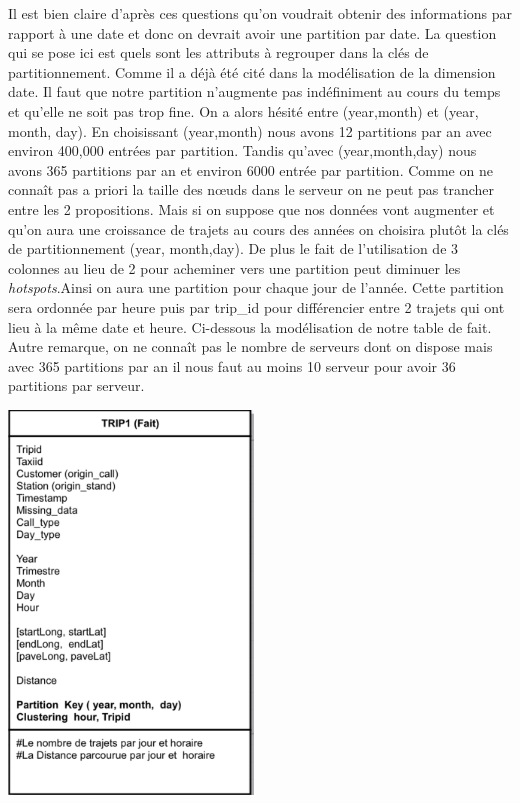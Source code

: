 \documentclass[]{report}
\begin{document}
	Il est bien claire d'après ces questions qu'on voudrait obtenir des informations par rapport à une date et donc on devrait avoir une partition par date. La question qui se pose ici est quels sont les attributs à regrouper dans la clés de partitionnement. Comme il a déjà été cité dans la modélisation de la dimension date. Il faut que notre partition n'augmente pas indéfiniment au cours du temps et qu'elle ne soit pas trop fine. On a alors hésité entre (year,month) et (year, month, day).  En choisissant (year,month) nous avons 12 partitions par an avec environ 400,000 entrées par partition. Tandis qu'avec (year,month,day) nous avons 365 partitions par an et environ 6000 entrée par partition. Comme on ne connaît pas a priori la taille des nœuds dans le serveur on ne peut pas trancher entre les 2 propositions. Mais si on  suppose que nos données vont augmenter et qu'on aura une croissance de trajets au cours des années on choisira plutôt la clés de partitionnement (year, month,day).  De plus le fait de l'utilisation de 3 colonnes au lieu de 2 pour acheminer vers une partition peut diminuer les \textit{hotspots}.Ainsi on aura une partition pour chaque jour de l'année. Cette partition sera ordonnée par heure puis par trip\_id pour différencier entre 2 trajets qui ont lieu à la même date et heure. Ci-dessous la modélisation de notre table de fait. Autre remarque, on ne connaît pas le nombre de serveurs dont on dispose mais avec 365 partitions par an il nous faut au moins 10 serveur pour avoir 36 partitions par serveur.
	\begin{center}
		\includegraphics[width=65mm]{Figures/Trip1.png}
		\label{fig:y=6}
	\end{center}
	
\end{document}
